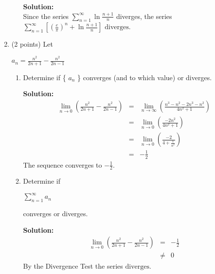 \documentclass[paper=a4, fontsize=11pt]{scrartcl} %
\numberwithin{equation}{section} %
\numberwithin{figure}{section} %
\numberwithin{table}{section} %
\begin{document}
\begin{enumerate}
\begin{enumerate}
\noindent\textbf{Solution:}\\
Since the series $\sum\limits_{n=1}^\infty \ln \frac{n+1}{n}$ diverges, the series $\sum\limits_{n=1}^\infty \left[ \left( \frac{e}{\pi} \right)^n + \ln \frac{n+1}{n} \right]$ $\boxed{ \text{diverges}}$.

\end{enumerate}

\vspace{.5in}
\item (2 points) Let \begin{large}$a_n=\frac{n^2}{2n+1}-\frac{n^2}{2n-1}$\end{large}
\begin{enumerate}
\item Determine if \{ $a_n$ \} converges (and to which value) or diverges.

\noindent\textbf{Solution:}\\
\begin{eqnarray*}
\lim\limits_{n \rightarrow 0} \left(\frac{n^2}{2n+1}-\frac{n^2}{2n-1}\right) &=& \lim\limits_{n \rightarrow \infty} \left(\frac{n^3-n^2-2n^3-n^2}{4n^2+1}\right)\\
&=& \lim\limits_{n \rightarrow 0} \left(\frac{-2n^2}{4n^2+1}\right)\\
&=& \lim\limits_{n \rightarrow 0} \left(\frac{-2}{4+\frac{1}{n^2}}\right)\\
&=& - \frac{1}{2}
\end{eqnarray*}
The sequence converges to $\boxed{-\frac{1}{2}}$.
\vspace{.5in}
\item Determine if \begin{large}$\sum\limits_{n=1}^\infty a_n$\end{large} converges or diverges.

\noindent\textbf{Solution:}\\
\begin{eqnarray*}
\lim\limits_{n \rightarrow 0} \left(\frac{n^2}{2n+1}-\frac{n^2}{2n-1}\right) &=& -\frac{1}{2} \\
 &\ne & 0
\end{eqnarray*}
By the Divergence Test the series $\boxed{ \text{diverges}}$.

\end{enumerate}

\newpage

\end{enumerate}

\end{document}
